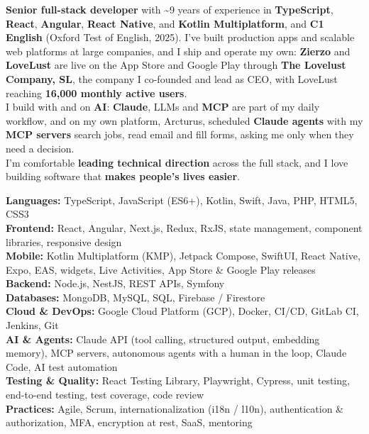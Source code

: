 \documentclass[9pt]{developercv} %
\begin{document}



\textbf{Senior full-stack developer} with \textasciitilde{}9 years of experience in \textbf{TypeScript}, \textbf{React}, \textbf{Angular}, \textbf{React Native}, and \textbf{Kotlin Multiplatform}, and \textbf{C1 English} (Oxford Test of English, 2025). I've built production apps and scalable web platforms at large companies, and I ship and operate my own: \textbf{Zierzo} and \textbf{LoveLust} are live on the App Store and Google Play through \textbf{The Lovelust Company, SL}, the company I co-founded and lead as CEO, with LoveLust reaching \textbf{16,000 monthly active users}.
\\
I build with and on \textbf{AI}: \textbf{Claude}, LLMs and \textbf{MCP} are part of my daily workflow, and on my own platform, Arcturus, scheduled \textbf{Claude agents} with my \textbf{MCP servers} search jobs, read email and fill forms, asking me only when they need a decision.
\\
I'm comfortable \textbf{leading technical direction} across the full stack, and I love building software that \textbf{makes people's lives easier}.



\textbf{Languages:} TypeScript, JavaScript (ES6+), Kotlin, Swift, Java, PHP, HTML5, CSS3\\
\textbf{Frontend:} React, Angular, Next.js, Redux, RxJS, state management, component libraries, responsive design\\
\textbf{Mobile:} Kotlin Multiplatform (KMP), Jetpack Compose, SwiftUI, React Native, Expo, EAS, widgets, Live Activities, App Store \& Google Play releases\\
\textbf{Backend:} Node.js, NestJS, REST APIs, Symfony\\
\textbf{Databases:} MongoDB, MySQL, SQL, Firebase / Firestore\\
\textbf{Cloud \& DevOps:} Google Cloud Platform (GCP), Docker, CI/CD, GitLab CI, Jenkins, Git\\
\textbf{AI \& Agents:} Claude API (tool calling, structured output, embedding memory), MCP servers, autonomous agents with a human in the loop, Claude Code, AI test automation\\
\textbf{Testing \& Quality:} React Testing Library, Playwright, Cypress, unit testing, end-to-end testing, test coverage, code review\\
\textbf{Practices:} Agile, Scrum, internationalization (i18n / l10n), authentication \& authorization, MFA, encryption at rest, SaaS, mentoring
\end{document}
